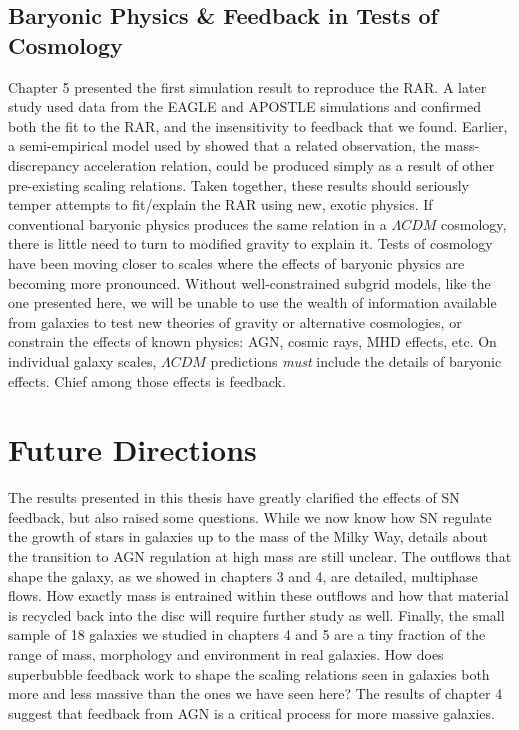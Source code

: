 \subsection{Baryonic Physics \& Feedback in Tests of Cosmology}
Chapter 5 presented the first simulation result to reproduce the
\citet{McGaugh2016} RAR.  A later study \citep{Ludlow2016} used data from the
EAGLE \citep{Schaye2015} and APOSTLE \citep{Sawala2016} simulations and
confirmed both the fit to the RAR, and the insensitivity to feedback that we
found.  Earlier, a semi-empirical model used by \citet{DiCintio2016} showed
that a related observation, the mass-discrepancy acceleration relation, could be
produced simply as a result of other pre-existing scaling relations.  Taken
together, these results should seriously temper attempts to fit/explain the RAR
using new, exotic physics.  If conventional baryonic physics produces the same
relation in a $\Lambda CDM$ cosmology, there is little need to turn to modified
gravity \citep{Moffat2016,Verlinde2016,Burrage2016} to explain it.  Tests of
cosmology have been moving closer to scales where the effects of baryonic
physics are becoming more pronounced.  Without well-constrained subgrid models,
like the one presented here, we will be unable to use the wealth of information
available from galaxies to test new theories of gravity or alternative
cosmologies, or constrain the effects of known physics: AGN, cosmic rays,
MHD effects, etc.  On individual galaxy scales, $\Lambda CDM$ predictions {\it must}
include the details of baryonic effects.  Chief among those effects is feedback.

\section{Future Directions}
The results presented in this thesis have greatly clarified the effects of SN
feedback, but also raised some questions.  While we now know how SN regulate the
growth of stars in galaxies up to the mass of the Milky Way, details about the
transition to AGN regulation at high mass are still unclear.  The outflows that
shape the galaxy, as we showed in chapters 3 and 4, are detailed, multiphase
flows.  How exactly mass is entrained within these outflows and how that
material is recycled back into the disc will require further study as well.
Finally, the small sample of 18 galaxies we studied in chapters 4 and 5 are a
tiny fraction of the range of mass, morphology and environment in real
galaxies.  How does superbubble feedback work to shape the scaling relations
seen in galaxies both more and less massive than the ones we have seen here?
The results of chapter 4 suggest that feedback from AGN is a critical process
for more massive galaxies.

